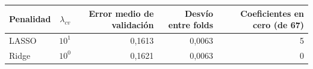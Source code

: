 \begin{tabular}{lcrrr}
\toprule
Penalidad & $\lambda_{cv}$ & Error medio de validación & Desvío entre folds & Coeficientes en cero (de 67) \\
\midrule
LASSO & $10^{1}$ & 0,1613 & 0,0063 & 5 \\
Ridge & $10^{0}$ & 0,1621 & 0,0063 & 0 \\
\bottomrule
\end{tabular}